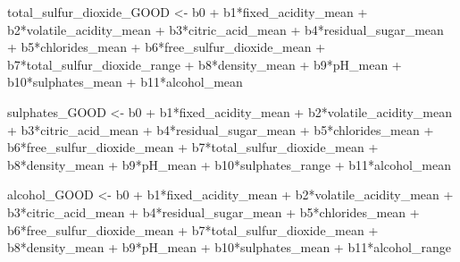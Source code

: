 \documentclass[
]{article}
\newenvironment{Shaded}{\begin{snugshade}}{\end{snugshade}}
\newcommand{\NormalTok}[1]{#1}
\newcommand{\OtherTok}[1]{\textcolor[rgb]{0.56,0.35,0.01}{#1}}
\newcommand{\SpecialCharTok}[1]{\textcolor[rgb]{0.00,0.00,0.00}{#1}}
\begin{document}
\begin{Shaded}
\begin{Highlighting}[]
\NormalTok{total\_sulfur\_dioxide\_GOOD }\OtherTok{\textless{}{-}}\NormalTok{ b0 }\SpecialCharTok{+}\NormalTok{ b1}\SpecialCharTok{*}\NormalTok{fixed\_acidity\_mean }\SpecialCharTok{+}\NormalTok{ b2}\SpecialCharTok{*}\NormalTok{volatile\_acidity\_mean }\SpecialCharTok{+}
\NormalTok{  b3}\SpecialCharTok{*}\NormalTok{citric\_acid\_mean }\SpecialCharTok{+}\NormalTok{ b4}\SpecialCharTok{*}\NormalTok{residual\_sugar\_mean }\SpecialCharTok{+}\NormalTok{ b5}\SpecialCharTok{*}\NormalTok{chlorides\_mean }\SpecialCharTok{+}\NormalTok{ b6}\SpecialCharTok{*}\NormalTok{free\_sulfur\_dioxide\_mean }\SpecialCharTok{+}
\NormalTok{  b7}\SpecialCharTok{*}\NormalTok{total\_sulfur\_dioxide\_range }\SpecialCharTok{+}\NormalTok{ b8}\SpecialCharTok{*}\NormalTok{density\_mean }\SpecialCharTok{+}\NormalTok{ b9}\SpecialCharTok{*}\NormalTok{pH\_mean }\SpecialCharTok{+}\NormalTok{ b10}\SpecialCharTok{*}\NormalTok{sulphates\_mean }\SpecialCharTok{+}\NormalTok{ b11}\SpecialCharTok{*}\NormalTok{alcohol\_mean}

\NormalTok{sulphates\_GOOD }\OtherTok{\textless{}{-}}\NormalTok{ b0 }\SpecialCharTok{+}\NormalTok{ b1}\SpecialCharTok{*}\NormalTok{fixed\_acidity\_mean }\SpecialCharTok{+}\NormalTok{ b2}\SpecialCharTok{*}\NormalTok{volatile\_acidity\_mean }\SpecialCharTok{+}
\NormalTok{  b3}\SpecialCharTok{*}\NormalTok{citric\_acid\_mean }\SpecialCharTok{+}\NormalTok{ b4}\SpecialCharTok{*}\NormalTok{residual\_sugar\_mean }\SpecialCharTok{+}\NormalTok{ b5}\SpecialCharTok{*}\NormalTok{chlorides\_mean }\SpecialCharTok{+}\NormalTok{ b6}\SpecialCharTok{*}\NormalTok{free\_sulfur\_dioxide\_mean }\SpecialCharTok{+}
\NormalTok{  b7}\SpecialCharTok{*}\NormalTok{total\_sulfur\_dioxide\_mean }\SpecialCharTok{+}\NormalTok{ b8}\SpecialCharTok{*}\NormalTok{density\_mean }\SpecialCharTok{+}\NormalTok{ b9}\SpecialCharTok{*}\NormalTok{pH\_mean }\SpecialCharTok{+}\NormalTok{ b10}\SpecialCharTok{*}\NormalTok{sulphates\_range }\SpecialCharTok{+}\NormalTok{ b11}\SpecialCharTok{*}\NormalTok{alcohol\_mean}

\NormalTok{alcohol\_GOOD }\OtherTok{\textless{}{-}}\NormalTok{ b0 }\SpecialCharTok{+}\NormalTok{ b1}\SpecialCharTok{*}\NormalTok{fixed\_acidity\_mean }\SpecialCharTok{+}\NormalTok{ b2}\SpecialCharTok{*}\NormalTok{volatile\_acidity\_mean }\SpecialCharTok{+}
\NormalTok{  b3}\SpecialCharTok{*}\NormalTok{citric\_acid\_mean }\SpecialCharTok{+}\NormalTok{ b4}\SpecialCharTok{*}\NormalTok{residual\_sugar\_mean }\SpecialCharTok{+}\NormalTok{ b5}\SpecialCharTok{*}\NormalTok{chlorides\_mean }\SpecialCharTok{+}\NormalTok{ b6}\SpecialCharTok{*}\NormalTok{free\_sulfur\_dioxide\_mean }\SpecialCharTok{+}
\NormalTok{  b7}\SpecialCharTok{*}\NormalTok{total\_sulfur\_dioxide\_mean }\SpecialCharTok{+}\NormalTok{ b8}\SpecialCharTok{*}\NormalTok{density\_mean }\SpecialCharTok{+}\NormalTok{ b9}\SpecialCharTok{*}\NormalTok{pH\_mean }\SpecialCharTok{+}\NormalTok{ b10}\SpecialCharTok{*}\NormalTok{sulphates\_mean }\SpecialCharTok{+}\NormalTok{ b11}\SpecialCharTok{*}\NormalTok{alcohol\_range}


\end{Highlighting}
\end{Shaded}
\end{document}
